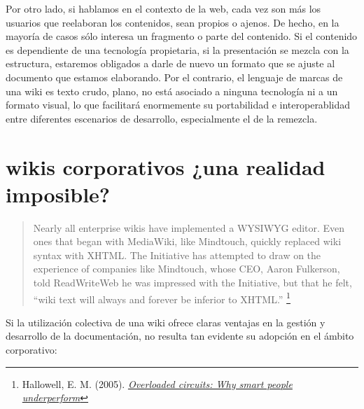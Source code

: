 \documentclass[12pt, a4paper,twoside]{book}
\begin{document}
Por otro lado, si hablamos en el contexto de la web, cada vez son
más los usuarios que reelaboran los contenidos, sean propios o
ajenos. De hecho, en la mayoría de casos sólo interesa un fragmento
o parte del contenido. Si el contenido es dependiente de una
tecnología propietaria, si la presentación se mezcla con la
estructura, estaremos obligados a darle de nuevo un formato que se
ajuste al documento que estamos elaborando. Por el contrario, el
lenguaje de marcas de una wiki es texto crudo, plano, no está
asociado a ninguna tecnología ni a un formato visual, lo que
facilitará enormemente su portabilidad e interoperablidad entre
diferentes escenarios de desarrollo, especialmente el de la
remezcla.

\section{wikis corporativos ¿una realidad imposible?}

\begin{quote}
Nearly all enterprise wikis have implemented a WYSIWYG editor. Even
ones that began with MediaWiki, like Mindtouch, quickly replaced
wiki syntax with XHTML. The Initiative has attempted to draw on the
experience of companies like Mindtouch, whose CEO, Aaron Fulkerson,
told ReadWriteWeb he was impressed with the Initiative, but that he
felt, ``wiki text will always and forever be inferior to XHTML.''%
\footnote{Hallowell, E. M. (2005).
\emph{\href{http://tr.im/wSsS}{Overloaded circuits: Why smart people underperform}}}

\end{quote}
Si la utilización colectiva de una wiki ofrece claras ventajas en
la gestión y desarrollo de la documentación, no resulta tan
evidente su adopción en el ámbito corporativo:
\end{document}
